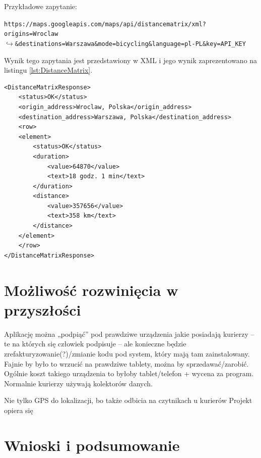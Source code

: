 \documentclass[eng,printmode,oneside]{mgr}
\begin{document}
Przykładowe zapytanie:

\begin{flushright}
\texttt{https://maps.googleapis.com/maps/api/distancematrix/xml?origins=Wroclaw
\\$\hookrightarrow$\&destinations=Warszawa\&mode=bicycling\&language=pl-PL\&key=API\_KEY}
\end{flushright}

Wynik tego zapytania jest przedstawiony w XML i jego wynik zaprezentowano na
listingu \ref{lst:DistanceMatrix}.

\begin{lstlisting}[caption=Przykład odpowiedzi na zapytanie
\texttt{DistanceMatrix},label=lst:DistanceMatrix] 
<DistanceMatrixResponse>
	<status>OK</status>
	<origin_address>Wroclaw, Polska</origin_address>
	<destination_address>Warszawa, Polska</destination_address>
	<row>
	<element>
		<status>OK</status>
		<duration>
			<value>64870</value>
			<text>18 godz. 1 min</text>
		</duration>
		<distance>
			<value>357656</value>
			<text>358 km</text>
		</distance>
	</element>
	</row>
</DistanceMatrixResponse>
\end{lstlisting}

\chapter{Możliwość rozwinięcia w przyszłości}
Aplikację można „podpiąć” pod prawdziwe urządzenia jakie posiadają kurierzy – te
na których się człowiek podpisuje – ale konieczne będzie
zrefakturyzowanie(?)/zmianie kodu pod system, który mają tam zainstalowany.
	Fajnie by było to wrzucić na prawdziwe tablety, można by sprzedawać/zarobić.
	Ogólnie koszt takiego urządzenia to byłoby tablet/telefon + wycena za program.
	Normalnie kurierzy używają kolektorów danych.
	
	
 Nie tylko GPS do lokalizacji, bo także odbicia
na czytnikach u kurierów Projekt opiera się 

\chapter{Wnioski i podsumowanie}

\listoffigures
\lstlistoflistings
\end{document}
